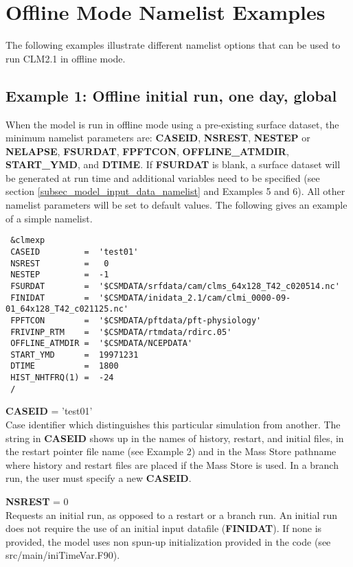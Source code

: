 \section {Offline Mode Namelist Examples}
\label{sec_examples}

The following examples illustrate different namelist options that 
can be used to run CLM2.1 in offline mode.

\subsection {Example 1: Offline initial run, one day, global}

When the model is run in offline mode using a pre-existing surface
dataset, the minimum namelist parameters are: {\bf CASEID}, {\bf
NSREST}, {\bf NESTEP} or {\bf NELAPSE}, {\bf FSURDAT}, {\bf FPFTCON},
{\bf OFFLINE\_ATMDIR}, {\bf START\_YMD}, and {\bf DTIME}. If {\bf
FSURDAT} is blank, a surface dataset will be generated at run time and
additional variables need to be specified (see section
\ref{subsec_model_input_data_namelist} and Examples 5 and 6).  All other
namelist parameters will be set to default values.  The following
gives an example of a simple namelist.

\begin{verbatim}
 &clmexp 
 CASEID         =  'test01'
 NSREST         =   0 
 NESTEP         =  -1 
 FSURDAT        =  '$CSMDATA/srfdata/cam/clms_64x128_T42_c020514.nc'
 FINIDAT        =  '$CSMDATA/inidata_2.1/cam/clmi_0000-09-01_64x128_T42_c021125.nc'
 FPFTCON        =  '$CSMDATA/pftdata/pft-physiology' 
 FRIVINP_RTM    =  '$CSMDATA/rtmdata/rdirc.05'
 OFFLINE_ATMDIR =  '$CSMDATA/NCEPDATA' 
 START_YMD      =  19971231
 DTIME          =  1800
 HIST_NHTFRQ(1) =  -24
 /
\end{verbatim}

\medskip \noindent 
{\bf CASEID} = 'test01' \\ Case identifier which distinguishes this
particular simulation from another. The string in {\bf CASEID} shows
up in the names of history, restart, and initial files, in the restart
pointer file name (see Example 2) and in the Mass Store pathname where
history and restart files are placed if the Mass Store is used.
In a branch run, the user must specify a new {\bf CASEID}.

\medskip \noindent 
{\bf NSREST} = 0 \\ Requests an initial run, as opposed to a restart
or a branch run. An initial run does not require the use of an initial
input datafile ({\bf FINIDAT}). If none is provided, the model uses
non spun-up initialization provided in the code (see
src/main/iniTimeVar.F90).

